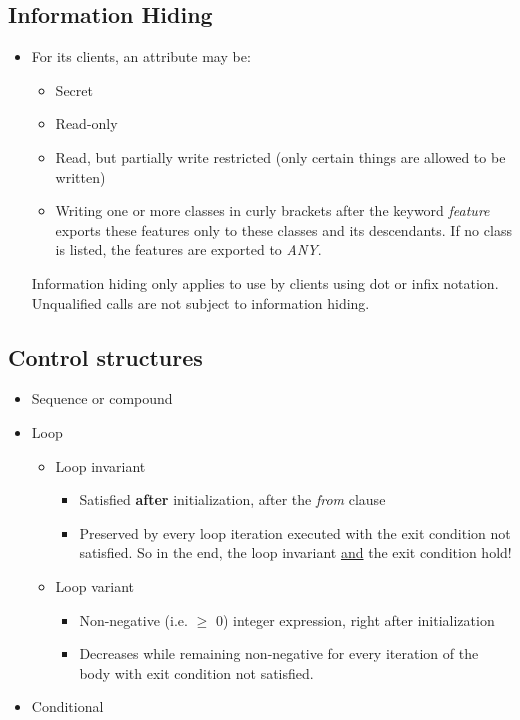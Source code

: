 \documentclass[a4paper]{article}
\begin{document}
\subsection{Information Hiding}
\begin{itemize}
\item For its clients, an attribute may be:
\begin{itemize}
\item Secret
\item Read-only
\item Read, but partially write restricted (only certain things are allowed to be written)
\item Writing one or more classes in curly brackets after the keyword \textsl{feature} exports these 
features only to these classes and its descendants. If no class is listed, the features 
are exported to \textsl{ANY}. 
\end{itemize}
Information hiding only applies to use by clients using dot or infix notation. Unqualified calls are not subject to information hiding. 
\end{itemize}

\subsection{Control structures}
\begin{itemize}
\item Sequence or compound
\item Loop
\begin{itemize}
\item Loop invariant
\begin{itemize}
\item Satisfied \textbf{after} initialization, after the \textsl{from} clause
\item Preserved by every loop iteration executed with the exit condition not satisfied. So in the end, the loop invariant \underline{and} the exit condition hold!
\end{itemize}
\item Loop variant
\begin{itemize}
\item Non-negative (i.e. $\geq$ 0) integer expression, right after initialization
\item Decreases while remaining non-negative for every iteration of the body with exit condition not satisfied. 
\end{itemize}
\end{itemize}
\item Conditional
\end{itemize}
\end{document}
